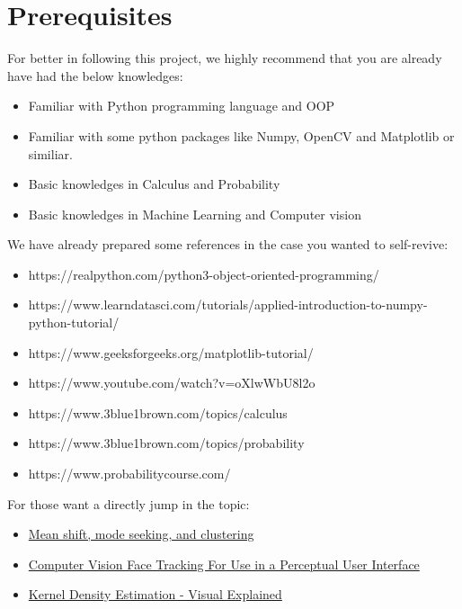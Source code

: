 \documentclass[11pt]{article}
\begin{document}
\section*{Prerequisites}
For better in following this project, we highly recommend that you are already have had the below knowledges:
\begin{itemize}
    \item Familiar with Python programming language and OOP
    \item Familiar with some python packages like Numpy, OpenCV and Matplotlib or similiar.
    \item Basic knowledges in Calculus and Probability
    \item Basic knowledges in Machine Learning and Computer vision
\end{itemize}
We have already prepared some references in the case you wanted to self-revive:
\begin{itemize}
    \item https://realpython.com/python3-object-oriented-programming/
    \item https://www.learndatasci.com/tutorials/applied-introduction-to-numpy-python-tutorial/
    \item https://www.geeksforgeeks.org/matplotlib-tutorial/
    \item https://www.youtube.com/watch?v=oXlwWbU8l2o
    \item https://www.3blue1brown.com/topics/calculus
    \item https://www.3blue1brown.com/topics/probability
    \item https://www.probabilitycourse.com/
\end{itemize}
For those want a directly jump in the topic:
\begin{itemize}
    \item \href{https://ieeexplore.ieee.org/document/400568}{Mean shift, mode seeking, and clustering}
    \item \href{http://opencv.jp/opencv-1.0.0_org/docs/papers/camshift.pdf}{Computer Vision Face Tracking For Use in a Perceptual User Interface}
    \item \href{https://mathisonian.github.io/kde/}{Kernel Density Estimation - Visual Explained}
\end{itemize}
\end{document}

